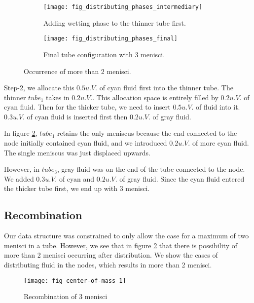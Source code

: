 	\begin{figure}[H]
		\centering
		\begin{subfigure}{0.48\textwidth}
			\centering
			\texttt{[image: fig\_distributing\_phases\_intermediary]}
			\caption{Adding wetting phase to the thinner tube first.}
		\end{subfigure}
		\begin{subfigure}{0.42\textwidth}
			\centering
			\texttt{[image: fig\_distributing\_phases\_final]}
			\caption{Final tube configuration with 3 menisci.}
			\label{fig:distributing_phases_final}
		\end{subfigure}
		\caption{Occurrence of more than 2 menisci.}
	\end{figure}
	
	Step-2, we allocate this $0.5 u.V.$ of cyan fluid first into the thinner tube. The thinner ${tube}_1$ takes in $0.2 u.V.$. This allocation space is entirely filled by $0.2 u.V.$ of cyan fluid. Then for the thicker tube, we need to insert $0.5 u.V.$ of fluid into it. $0.3 u.V.$ of cyan fluid is inserted first then $0.2 u.V.$ of gray fluid.
	
	
	
	In figure \ref{fig:distributing_phases_final}, ${tube}_1$ retains the only meniscus because the end connected to the node initially contained cyan fluid, and we introduced $0.2 u.V.$ of more cyan fluid. The single meniscus was just displaced upwards.
	
	However, in ${tube}_3$, gray fluid was on the end of the tube connected to the node. We added $0.3 u.V.$ of cyan and $0.2 u.V.$ of gray fluid. Since the cyan fluid entered the thicker tube first, we end up with 3 menisci.	

\subsection{Recombination} \label{sec:recombination-details}
	Our data structure was constrained to only allow the case for a maximum of two menisci in a tube. However, we see that in figure \ref{fig:distributing_phases_final} that there is possibility of more than 2 menisci occurring after distribution. We show the cases of distributing fluid in the nodes, which results in more than 2 menisci.
	
	\begin{figure}[H]
		\centering
		\texttt{[image: fig\_center-of-mass\_1]}
		\caption{Recombination of 3 menisci}
		\label{fig_center-of-mass_1}
	\end{figure}
	
